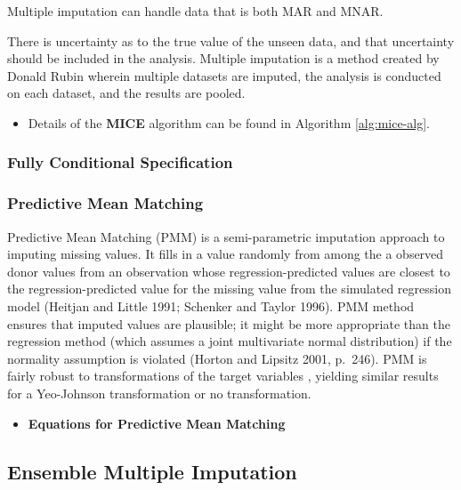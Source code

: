 \documentclass[12pt,]{article}
\providecommand{\tightlist}{%
  \setlength{\itemsep}{0pt}\setlength{\parskip}{0pt}}
\begin{document}
Multiple imputation can handle data that is both MAR and MNAR.

There is uncertainty as to the true value of the unseen data, and that
uncertainty should be included in the analysis. Multiple imputation is a
method created by Donald Rubin wherein multiple datasets are imputed,
the analysis is conducted on each dataset, and the results are pooled.

\begin{itemize}
\tightlist
\item
  Details of the \textbf{MICE} algorithm can be found in Algorithm
  \ref{alg:mice-alg}.
\end{itemize}

\subsubsection{Fully Conditional
Specification}\label{fully-conditional-specification}

\subsubsection{Predictive Mean Matching}\label{predictive-mean-matching}

Predictive Mean Matching (PMM) is a semi-parametric imputation approach
to imputing missing values. It fills in a value randomly from among the
a observed donor values from an observation whose regression-predicted
values are closest to the regression-predicted value for the missing
value from the simulated regression model (Heitjan and Little 1991;
Schenker and Taylor 1996). PMM method ensures that imputed values are
plausible; it might be more appropriate than the regression method
(which assumes a joint multivariate normal distribution) if the
normality assumption is violated (Horton and Lipsitz 2001, p.~246). PMM
is fairly robust to transformations of the target variables
\citep{van_buuren_flexible_2012}, yielding similar results for a
Yeo-Johnson transformation or no transformation.

\begin{itemize}
\tightlist
\item
  \textbf{Equations for Predictive Mean Matching}
\end{itemize}

\subsection{Ensemble Multiple
Imputation}\label{ensemble-multiple-imputation}
\end{document}
